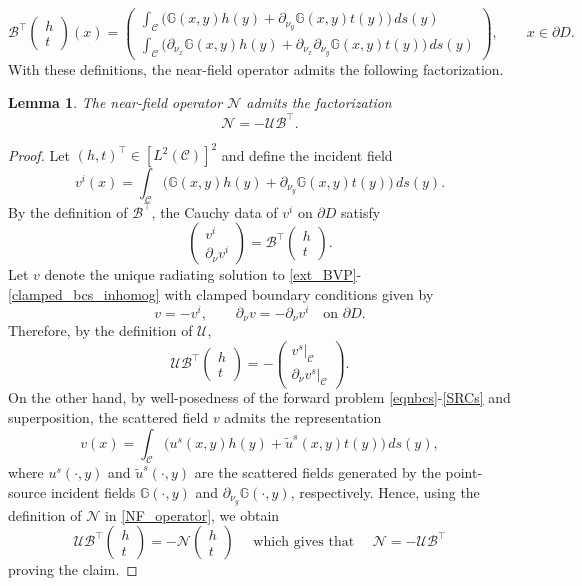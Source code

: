 \documentclass{article}
\newtheorem{Lemma}[Theorem]{Lemma}
\begin{document}
\[
\mathcal B^\top
\begin{pmatrix}
h\\
t
\end{pmatrix}(x)
=
\begin{pmatrix}
\displaystyle
\int_{\mathcal C}
\Big(
\mathbb G(x,y)h(y)
+
\partial_{\nu_y}\mathbb G(x,y)t(y)
\Big)\,ds(y)
\\[3ex]
\displaystyle
\int_{\mathcal C}
\Big(
\partial_{\nu_x}\mathbb G(x,y)h(y)
+
\partial_{\nu_x}\partial_{\nu_y}\mathbb G(x,y)t(y)
\Big)\,ds(y)
\end{pmatrix},
\qquad x\in\partial D.
\]
With these definitions, the near-field operator admits the following
factorization.
\begin{Lemma}
The near-field operator $\mathcal N$ admits the factorization
\[
\mathcal N=-\mathcal U\mathcal B^\top .
\]
\end{Lemma}
\begin{proof}
Let $(h,t)^\top\in [L^2(\mathcal C)]^2$ and define the incident field
\[
v^i(x)=
\int_{\mathcal C}
\big(
\mathbb G(x,y)h(y)
+\partial_{\nu_y}\mathbb G(x,y)t(y)
\big)\,ds(y).
\]
By the definition of $\mathcal B^\top$, the Cauchy data of $v^i$ on
$\partial D$ satisfy
\[
\begin{pmatrix}
v^i\\
\partial_\nu v^i
\end{pmatrix}
=
\mathcal B^\top
\begin{pmatrix}
h\\
t
\end{pmatrix}.
\]
Let $v$ denote the unique radiating solution to \eqref{ext_BVP}-\eqref{clamped_bcs_inhomog} with clamped boundary conditions given by 
\[
v=-v^i,\qquad
\partial_\nu v=-\partial_\nu v^i
\quad\text{on }\partial D .
\]
Therefore, by the definition of $\mathcal U$,
\[
\mathcal U\mathcal B^\top
\begin{pmatrix}
h\\
t
\end{pmatrix}
=
-
\begin{pmatrix}
v^s|_{\mathcal C}\\
\partial_\nu v^s|_{\mathcal C}
\end{pmatrix}.
\]
On the other hand, {by well-posedness of the forward problem \eqref{eqnbcs}-\eqref{SRCs} and superposition}, the scattered field $v$ admits the representation
\[
v(x)
=
\int_{\mathcal C}
\big(
u^s(x,y)h(y)+\tilde u^s(x,y)t(y)
\big)\,ds(y),
\]
where $u^s(\cdot,y)$ and $\tilde u^s(\cdot,y)$ are the scattered fields
generated by the point-source incident fields
$\mathbb G(\cdot,y)$ and $\partial_{\nu_y}\mathbb G(\cdot,y)$,
respectively. Hence, using the definition of $\mathcal N$ in
\eqref{NF_operator}, we obtain
\[
\mathcal U\mathcal B^\top
\begin{pmatrix}
h\\
t
\end{pmatrix}
=
-\mathcal N
\begin{pmatrix}
h\\
t
\end{pmatrix}
\quad \text{ which gives that } \quad \mathcal N=-\mathcal U\mathcal B^\top 
\]
proving the claim. 
\end{proof}
\end{document}
